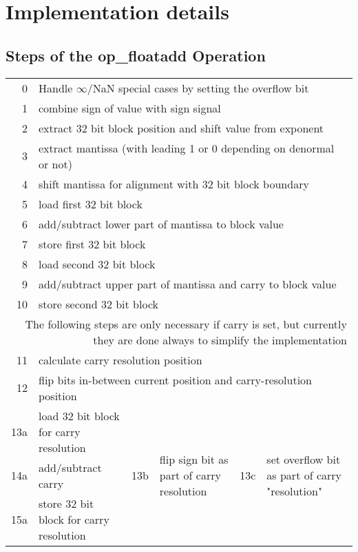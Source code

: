 \section{Implementation details}
\subsection{Steps of the op\_floatadd Operation}

\renewcommand\tabline[2]{#1 & \multicolumn{5}{p{0.8\textwidth}|}{#2}\\}
\begin{center}
\begin{tabular}{|r|p{}|r|p{}|r|p{}|}
\hline
\tabline {  0} {Handle $\infty$/NaN special cases by setting the overflow bit}
\tabline {  1} {combine sign of value with sign signal}
\tabline {  2} {extract 32 bit block position and shift value from exponent}
\tabline {  3} {extract mantissa (with leading 1 or 0 depending on denormal or not)}
\tabline {  4} {shift mantissa for alignment with 32 bit block boundary}
\tabline {  5} {load first 32 bit block}
\tabline {  6} {add/subtract lower part of mantissa to block value}
\tabline {  7} {store first 32 bit block}
\tabline {  8} {load second 32 bit block}
\tabline {  9} {add/subtract upper part of mantissa and carry to block value}
\tabline { 10} {store second 32 bit block}
\hline\hline
\multicolumn{6}{|p{0.75\textwidth}|}{
    The following steps are only necessary if carry is set,
    but currently they are done always to simplify the implementation}\\
\hline\hline
\tabline { 11} {calculate carry resolution position}
\tabline { 12} {flip bits in-between current position and carry-resolution position}
\hline
13a & load 32 bit block for carry resolution &
\multirow{3}{*}{13b} & \multirow{3}{0.25\textwidth}{flip sign bit as part of carry resolution} &
\multirow{3}{*}{13c} & \multirow{3}{0.25\textwidth}{set overflow bit as part of carry "resolution"}\\
14a & add/subtract carry & & & &\\
15a & store 32 bit block for carry resolution & & & &\\
\hline
\end{tabular}
\end{center}

